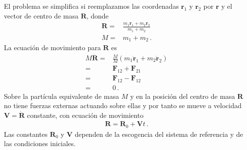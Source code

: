 El problema se simplifica si reemplazamos las coordenadas $\mathbf{r}_1$ y $\mathbf{r}_2$ por $\mathbf{r}$ y el vector de centro de masa $\mathbf{R}$, donde
\begin{align}
  \label{eq:Rcm}
  \mathbf{R}=&\frac{m_1\mathbf{r}_1+m_2\mathbf{r}_2}{m_1+m_2}\nonumber\\
  M=&m_1+m_2\,.
\end{align}
La ecuación de movimiento para $\mathbf{R}$ es
\begin{align}
  M \ddot{\mathbf{R}}=&\frac{M}{M}(m_1\ddot{\mathbf{r}}_1+m_2\ddot{\mathbf{r}}_2)\nonumber\\
  =&\mathbf{F}_{12}+\mathbf{F}_{21}\nonumber\\
  =&\mathbf{F}_{12}-\mathbf{F}_{12}\nonumber\\
  =&0\,.
\end{align}
Sobre la partícula equivalente de masa $M$ y en la posición del centro de masa $\mathbf{R}$ no tiene fuerzas externas actuando sobre ellas y por tanto se mueve a velocidad $\mathbf{V}=\dot{\mathbf{R}}$ constante, con ecuación de movimiento
\begin{align}
  \mathbf{R}=\mathbf{R}_0+\mathbf{V}t\,.
\end{align}
Las constantes $\mathbf{R}_0$ y $\mathbf{V}$ dependen de la escogencia del sistema de referencia y de las condiciones iniciales. 

